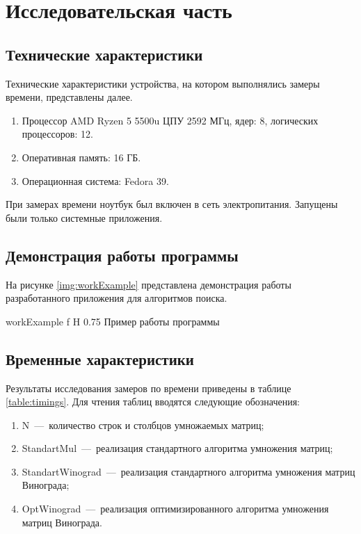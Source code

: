 \chapter{Исследовательская часть}
\section{Технические характеристики}

Технические характеристики устройства, на котором выполнялись замеры времени, представлены далее.

\begin{enumerate}
	\item Процессор	AMD Ryzen 5 5500u ЦПУ 2592 МГц, ядер: 8, логических процессоров: 12.
	\item Оперативная память: 16 ГБ.
	\item Операционная система: Fedora 39.
\end{enumerate}

При замерах времени ноутбук был включен в сеть электропитания. Запущены были только системные приложения.

\section{Демонстрация работы программы}

На рисунке \ref{img:workExample} представлена демонстрация работы разработанного приложения для алгоритмов поиска.

{workExample}
{f}
{H}
{0.75\textwidth}
{Пример работы программы}

\section{Временные характеристики}
Результаты исследования замеров по времени приведены в таблице \ref{table:timings}.
Для чтения таблиц вводятся следующие обозначения:
\begin{enumerate}[label=\arabic*)]
	\item N~---~количество строк и столбцов умножаемых матриц;
	\item StandartMul~---~реализация стандартного алгоритма умножения матриц;
	\item StandartWinograd~---~реализация стандартного алгоритма умножения матриц Винограда;
	\item OptWinograd~---~реализация оптимизированного алгоритма умножения матриц Винограда.
\end{enumerate}

